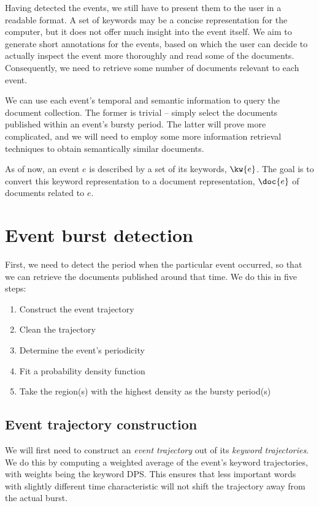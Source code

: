 Having detected the events, we still have to present them to the user in a readable format. A set of keywords may be a concise representation for the computer, but it does not offer much insight into the event itself. We aim to generate short annotations for the events, based on which the user can decide to actually inspect the event more thoroughly and read some of the documents. Consequently, we need to retrieve some number of documents relevant to each event.

We can use each event's temporal and semantic information to query the document collection. The former is trivial -- simply select the documents published within an event's bursty period. The latter will prove more complicated, and we will need to employ some more information retrieval techniques to obtain semantically similar documents.

As of now, an event $e$ is described by a set of its keywords, $\kw{e}$. The goal is to convert this keyword representation to a document representation, $\doc{e}$ of documents related to $e$.

\section{Event burst detection}
First, we need to detect the period when the particular event occurred, so that we can retrieve the documents published around that time. We do this in five steps:

\begin{enumerate}
	\item Construct the event trajectory
	\item Clean the trajectory
	\item Determine the event's periodicity
	\item Fit a probability density function
	\item Take the region(s) with the highest density as the bursty period(s)
\end{enumerate}


\subsection{Event trajectory construction}
We will first need to construct an \textit{event trajectory} out of its \textit{keyword trajectories}. We do this by computing a weighted average of the event's keyword trajectories, with weights being the keyword DPS. This ensures that less important words with slightly different time characteristic will not shift the trajectory away from the actual burst.

